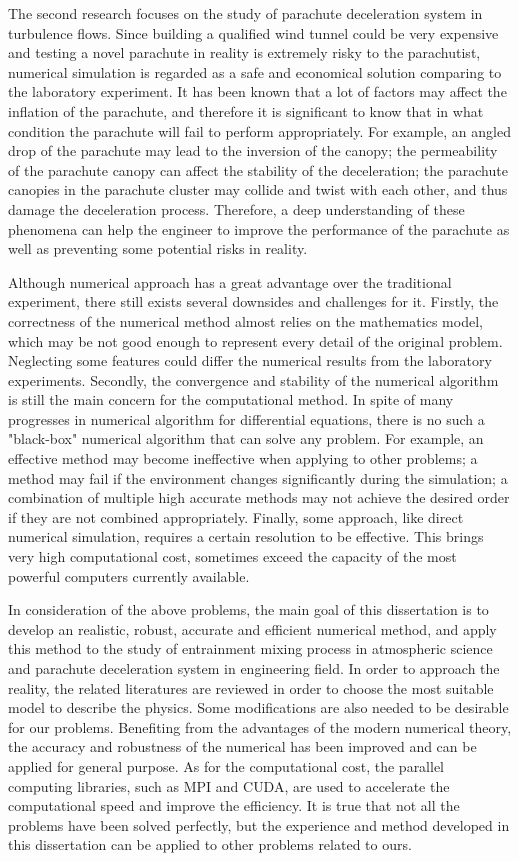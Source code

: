 The second research focuses on the study of parachute deceleration system in turbulence flows.
Since building a qualified wind tunnel could be very expensive and testing a novel parachute in 
reality is extremely risky to the parachutist, numerical simulation is regarded as a safe 
and economical solution comparing to the laboratory experiment. It has been known that a lot of factors
may affect the inflation of the parachute, and therefore it is significant to know that in what condition
the parachute will fail to perform appropriately. For example, an angled drop of the parachute may lead
to the inversion of the canopy; the permeability of the parachute canopy can affect the stability of the 
deceleration; the parachute canopies in the parachute cluster may collide and twist with each other, and thus 
damage the deceleration process. Therefore, a deep understanding of these phenomena can help the engineer to 
improve the performance of the parachute as well as preventing some potential risks in reality.

Although numerical approach has a great advantage over the traditional experiment, there still exists 
several downsides and challenges for it. Firstly, the correctness of the numerical method almost 
relies on the mathematics model, which may be not good enough to represent every detail of 
the original problem. Neglecting some features could differ the numerical results 
from the laboratory experiments. 
Secondly, the convergence and stability of the numerical algorithm
is still the main concern for the computational method. In spite of many progresses in numerical algorithm 
for differential equations, 
there is no such a "black-box" numerical algorithm that can solve any problem. For example, an effective 
method may become ineffective when applying to other problems; a method may fail if the environment changes 
significantly during the simulation; a combination of multiple high accurate 
methods may not achieve the desired order if they are not combined appropriately.
Finally, some approach, like direct numerical simulation, requires a certain resolution to be effective.
This brings very high computational cost, sometimes exceed the capacity of the most powerful computers currently 
available.

In consideration of the above problems, the main goal of this dissertation is to develop an realistic, robust, accurate 
and efficient numerical method, and apply this method to the study of entrainment mixing process in atmospheric science and parachute deceleration system in engineering field. In order to approach the reality, the related literatures are reviewed in order to choose the most suitable model to describe the physics. 
Some modifications are also needed to 
be desirable for our problems. Benefiting from the advantages of the modern numerical theory, the accuracy and robustness of the numerical has been improved and can be applied for general purpose. As for the computational cost, the parallel computing libraries, such as MPI and CUDA, are used to accelerate the computational speed and improve the efficiency.
It is true that not all the problems have been solved perfectly, but the experience and method developed in this dissertation can be applied to other problems related to ours.

